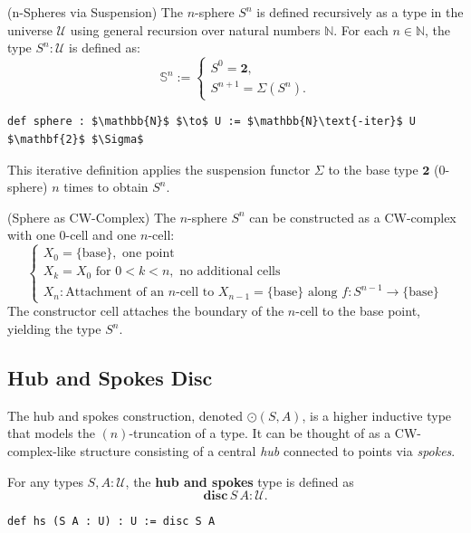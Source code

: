 \documentclass{article}
\begin{document}
\begin{definition} (n-Spheres via Suspension)
The \( n \)-sphere \( S^n \) is defined recursively as a type in
the universe \( \mathcal{U} \) using general recursion over natural
numbers \( \mathbb{N} \). For each \( n \in \mathbb{N} \),
the type \( S^n : \mathcal{U} \) is defined as:
\[
\mathbb{S}^n :=
\begin{cases}
S^0 = \mathbf{2}, \\
S^{n+1} = \Sigma(S^n).
\end{cases}
\]
\begin{lstlisting}[mathescape=true]
def sphere : $\mathbb{N}$ $\to$ U := $\mathbb{N}\text{-iter}$ U $\mathbf{2}$ $\Sigma$
\end{lstlisting}
This iterative definition applies the suspension functor \( \Sigma \)
to the base type \( \mathbf{2} \) (0-sphere) \( n \) times to obtain \( S^n \).
\end{definition}

\begin{example} (Sphere as CW-Complex)
The \( n \)-sphere \( S^n \) can be constructed as a CW-complex with
one 0-cell and one \( n \)-cell:
\[
\begin{cases}
X_0 = \{ \text{base} \}, \text{ one point} \\
X_k = X_0 \text{ for } 0 < k < n, \text{ no additional cells} \\
X_n: \text{Attachment of an } n\text{-cell to } X_{n-1} = \{ \text{base} \} \text{ along } f : S^{n-1} \to \{ \text{base} \}
\end{cases}
\]
The constructor \( \text{cell} \) attaches the boundary of the \( n \)-cell
to the base point, yielding the type \( S^n \).
\end{example}

\newpage
\subsection{Hub and Spokes Disc}

The hub and spokes construction, denoted \(\odot(S, A)\), is a higher inductive type that models the \((n)\)-truncation of a type. It can be thought of as a CW-complex-like structure consisting of a central \emph{hub} connected to points via \emph{spokes}.

\begin{definition}[Formation]
For any types \(S, A : \mathcal{U}\), the \textbf{hub and spokes} type is defined as
\[
\mathbf{disc}\, S\, A : \mathcal{U}.
\]

\begin{lstlisting}[mathescape=true]
def hs (S A : U) : U := disc S A
\end{lstlisting}
\end{definition}
\end{document}
